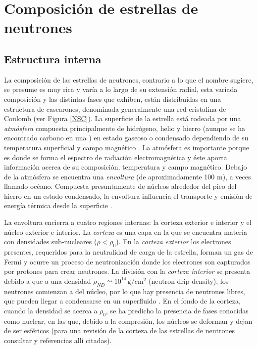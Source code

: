 \chapter{Composición de estrellas de neutrones}

\section{Estructura interna}
La composición de las estrellas de neutrones, contrario a lo que el nombre sugiere, se presume es muy rica y varía a lo largo de su extensión radial, esta variada composición y las distintas fases que exhiben, están distribuidas en una estructura de cascarones, denominada generalmente una red cristalina de Coulomb (ver Figura \ref{NSC}).
La superficie de la estrella está rodeada por una \emph{atmósfera} compuesta principalmente de hidrógeno, helio y hierro (aunque se ha encontrado carbono en una \cite{Ho2009ARemnant}) en estado gaseoso o condensado dependiendo de su temperatura superficial y campo magnético \cite{Zavlin2002ModelingAtmospheres}. La atmósfera es importante porque es donde se forma el espectro de radiación electromagnética y éste aporta información acerca de su composición, temperatura y campo magnético.
Debajo de la atmósfera se encuentra una \emph{envoltura} (de aproximadamente 100 \si{\metre}), a veces llamado océano. Compuesta presuntamente de núcleos alrededor del pico del hierro en un estado condensado, la envoltura influencia el transporte y emisión de energía térmica desde la superficie \cite{Piekarewicz2013,Potekhin,Lattimer2004}.

La envoltura encierra a cuatro regiones internas: la corteza exterior e interior y el núcleo exterior e interior. La \emph{corteza} es una capa en la que se encuentra materia con densidades sub-nucleares ($\rho < \rho_0$). En la \emph{corteza exterior} los electrones presentes, requeridos para la neutralidad de carga de la estrella, forman un gas de Fermi y ocurre un proceso de neutronización donde los electrones son capturados por protones para crear neutrones. La división con la \emph{corteza interior} se presenta debido a que a una densidad $\rho_{ND}\simeq 10^{14}\, \si{\gram\per\centi\metre^2}$ (neutron drip density), los neutrones comienzan a  del núcleo, por lo que hay presencia de neutrones libres, que pueden llegar a condensarse en un superfluido \cite{Baldo2005SuperfluidityMatter}. En el fondo de la corteza, cuando la densidad se acerca a $\rho_0$, se ha predicho la presencia de fases conocidas como  nuclear, en las que, debido a la compresión, los núcleos se deforman y dejan de ser esféricos (para una revisión de la corteza de las estrellas de neutrones consultar \cite{Chamel2008} y referencias allí citadas). 

